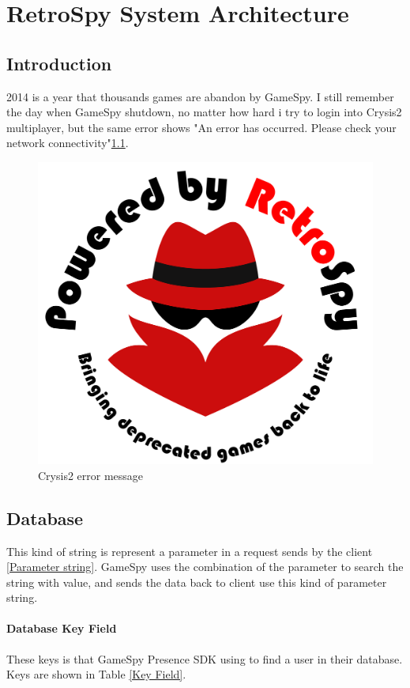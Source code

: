\documentclass[oneside,titlepage,a4paper]{Definition/retrospy} %
\begin{document}
\part{RetroSpy System Architecture}



\chapter{Introduction}
2014 is a year that thousands games are abandon by GameSpy. I still remember the day when GameSpy shutdown, no matter how hard i try to login into Crysis2 multiplayer, but the same error shows "An error has occurred. Please check your network connectivity"\ref{Crysis2 error message}.
\begin{figure}[H]
	\centering
	\caption{Crysis2 error message}
	\label{Crysis2 error message}
	\includegraphics[scale=0.25]{Pictures/RetroSpyLogoWithText.png}
\end{figure}

\chapter{Database}
This kind of string is represent a parameter in a request sends by the client \ref{Parameter string}. GameSpy uses the combination of the parameter to search the string with value, and sends the data back to client use this kind of parameter string.
\subsection{Database Key Field}
These keys is that GameSpy Presence SDK using to find a user in their database. Keys are shown in Table \ref{Key Field}.
\end{document}
